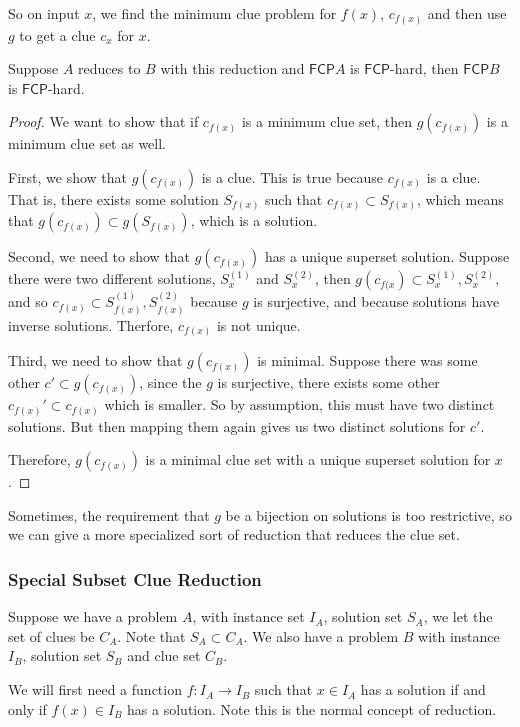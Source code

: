 \documentclass[runningheads,a4paper]{llncs}
\begin{document}
So on input $x$, we find the minimum clue problem for $f(x)$, $c_{f(x)}$ and then use $g$ to get a clue $c_x$ for $x$.  

\begin{theorem}
Suppose $A$ reduces to $B$ with this reduction and $\mathsf{FCP} A$ is $\mathsf{FCP}$-hard, then $\mathsf{FCP} B$ is $\mathsf{FCP}$-hard. 
\end{theorem}

\begin{proof}
We want to show that if $c_{f(x)}$ is a minimum clue set, then $g(c_{f(x)})$ is a minimum clue set as well.

First, we show that $g(c_{f(x)})$ is a clue. This is true because $c_{f(x)}$ is a clue. That is, there exists some solution $S_{f(x)}$ such that $c_{f(x)} \subset S_{f(x)}$, which means that $g(c_{f(x)}) \subset g(S_{f(x)})$, which is a solution.

Second, we need to show that $g(c_{f(x)})$ has a unique superset solution. Suppose there were two different solutions, $S_x^{(1)}$ and $S_{x}^{(2)}$, then $g(c_{f(x}) \subset S_x^{(1)}, S_x^{(2)}$, and so $c_{f(x)} \subset S_{f(x)}^{(1)}, S_{f(x)}^{(2)}$ because $g$ is surjective, and because solutions have inverse solutions. Therfore, $c_{f(x)}$ is not unique.

Third, we need to show that $g(c_{f(x)})$ is minimal. Suppose there was some other $c' \subset g(c_{f(x)})$, since the $g$ is surjective, there exists some other $c_{f(x)}' \subset c_{f(x)}$ which is smaller. So by assumption, this must have two distinct solutions. But then mapping them again gives us two distinct solutions for $c'$. 

Therefore, $g(c_{f(x)})$ is a minimal clue set with a unique superset solution for $x$.
\end{proof}

Sometimes, the requirement that $g$ be a bijection on solutions is too restrictive, so we can give a more specialized sort of reduction that reduces the clue set.

\subsubsection{Special Subset Clue Reduction}
Suppose we have a problem $A$, with instance set $I_A$, solution set $S_A$, we let the set of clues be $C_A$. Note that $S_A \subset C_A$. We also have a problem $B$ with instance $I_B$, solution set $S_B$ and clue set $C_B$. 

We will first need a function $f: I_A \rightarrow I_B$ such that $x \in I_A$ has a solution if and only if $f(x) \in I_B$ has a solution. Note this is the normal concept of reduction.
\end{document}
